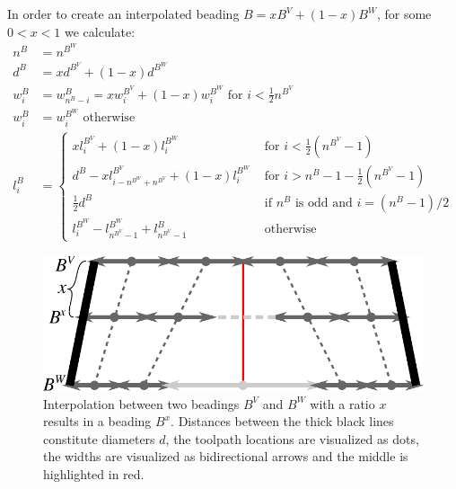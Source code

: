 In order to create an interpolated beading $B = xB^V + (1-x) B^W$, for some $0<x<1$
we calculate:
\begin{align*}
n^{B} &= n^{B^W} \\
d^B &= x d^{B^V} + (1-x) d^{B^W} \\
w_i^{B} &= w_{n^B-i}^{B} = x w_i^{B^V} + (1-x) w_i^{B^W} \text{ for } i < \frac12 n^{B^V} \\
w_i^{B} &= w_i^{B^W} \text{ otherwise}\\
l_i^{B} &= 
\begin{cases} 
x l_i^{B^V} + (1-x) l_i^{B^W} & \text{ for } i < \frac12 (n^{B^V} - 1) \\
d^B - x l_{i-n^{B^W}+n^{B^V}}^{B^V} + (1-x) l_i^{B^W} & \text{ for } i > n^B - 1 - \frac12 (n^{B^V} - 1) \\
\frac12 d^B  & \text{ if $n^B$ is odd and } i = (n^B - 1) / 2 \\
l_i^{B^W} - l_{n^{B^V}-1}^{B^W} + l_{n^{B^V}-1}^B & \text{ otherwise}
\end{cases}
\end{align*}
\fi

\begin{figure}
\centering
\includegraphics[width=.8\columnwidth]{sources/method/beading_interpolation_v2.pdf}
\caption{
Interpolation between two beadings $B^V$ and $B^W$ with a ratio $x$ results in a beading $B^x$.
Distances between the thick black lines constitute diameters $d$,
the toolpath locations are visualized as dots,
the widths are visualized as bidirectional arrows
and the middle is highlighted in red.
}
\label{beading_interpolation}
\end{figure}

\iffalse
